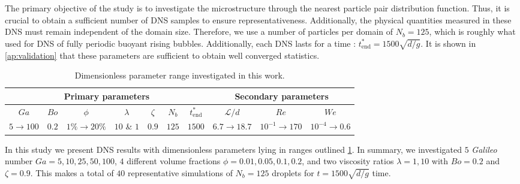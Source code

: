 The primary objective of the study is to investigate the microstructure through the nearest particle pair distribution function.
Thus, it is crucial to obtain a sufficient number of DNS samples to ensure representativeness. 
Additionally, the physical quantities measured in these DNS must remain independent of the domain size. 
Therefore, we use a number of particles per domain of $N_b = 125$, which is roughly what \citet{hidman2023assessing} used for DNS of fully periodic buoyant rising bubbles.
Additionally, each DNS lasts for a time : $t^*_\text{end} = 1500 \sqrt{d/g}$.
It is shown in \ref{ap:validation} that these parameters  are sufficient to obtain well converged statistics.  
\begin{table}[h!]
    \centering
    \caption{Dimensionless parameter range investigated in this work.}
    \begin{tabular}{|ccccccc|ccc|}\hline
        \multicolumn{7}{|c|}{Primary parameters}&\multicolumn{3}{|c|}{Secondary parameters}\\\hline\hline
        $Ga$&$Bo$&$\phi$&$\lambda$&$\zeta$&$N_b$&$t^*_\text{end}$&$\mathcal{L}/d$&$Re$&$We$\\ \hline
        $5\rightarrow 100$&$0.2$&$1\% \rightarrow 20\%$&$10$ \& $1$&$0.9$&$125$&$1500$&$6.7\to 18.7$&$10^{-1}\to 170$&$10^{-4}\to 0.6$\\ \hline
    \end{tabular}
    \label{tab:simulations}
\end{table}
In this study we present DNS results with dimensionless parameters lying in ranges outlined \ref{tab:simulations}.
In summary, we investigated $5$ \textit{Galileo} number $Ga = 5,10,25,50,100$, $4$ different volume fractions $\phi = 0.01,0.05,0.1,0.2$, and two viscosity ratios $\lambda =1,10$ with $Bo = 0.2$ and $\zeta = 0.9$. 
This makes a total of $40$ representative simulations of $N_b = 125$ droplets for $t= 1500 \sqrt{d/g}$ time. 
